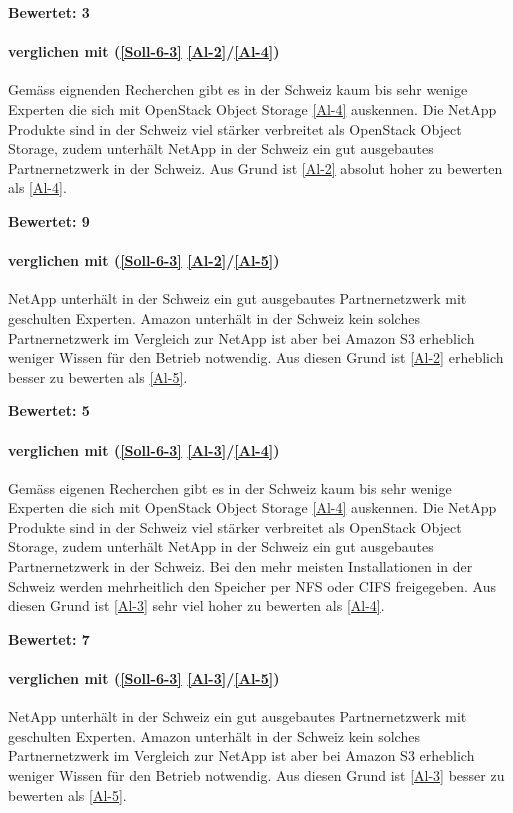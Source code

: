 \textbf{Bewertet: 3}

\paragraph*{  verglichen mit  (\ref{Soll-6-3} \ref{Al-2}/\ref{Al-4})}
Gemäss eignenden Recherchen gibt es in der Schweiz kaum bis sehr wenige Experten die sich mit OpenStack Object Storage \ref{Al-4} auskennen. Die NetApp Produkte sind in der Schweiz viel stärker verbreitet als OpenStack Object Storage, zudem unterhält NetApp in der Schweiz ein gut ausgebautes Partnernetzwerk in der Schweiz. Aus Grund ist  \ref{Al-2} absolut hoher zu bewerten als  \ref{Al-4}.

\textbf{Bewertet: 9}

\paragraph*{  verglichen mit  (\ref{Soll-6-3} \ref{Al-2}/\ref{Al-5})}
NetApp unterhält in der Schweiz ein gut ausgebautes Partnernetzwerk mit geschulten Experten. Amazon unterhält in der Schweiz kein solches Partnernetzwerk im Vergleich zur NetApp ist aber bei Amazon S3 erheblich weniger Wissen für den Betrieb notwendig. Aus diesen Grund ist  \ref{Al-2} erheblich besser zu bewerten als  \ref{Al-5}.

\textbf{Bewertet: 5}

\paragraph*{  verglichen mit  (\ref{Soll-6-3} \ref{Al-3}/\ref{Al-4})}
Gemäss eigenen Recherchen gibt es in der Schweiz kaum bis sehr wenige Experten die sich mit OpenStack Object Storage \ref{Al-4} auskennen. Die NetApp Produkte sind in der Schweiz viel stärker verbreitet als OpenStack Object Storage, zudem unterhält NetApp in der Schweiz ein gut ausgebautes Partnernetzwerk in der Schweiz. Bei den mehr meisten Installationen in der Schweiz werden mehrheitlich den Speicher per NFS oder CIFS freigegeben. Aus diesen Grund ist  \ref{Al-3} sehr viel hoher zu bewerten als  \ref{Al-4}.

\textbf{Bewertet: 7}


\paragraph*{  verglichen mit  (\ref{Soll-6-3} \ref{Al-3}/\ref{Al-5})}
NetApp unterhält in der Schweiz ein gut ausgebautes Partnernetzwerk mit geschulten Experten. Amazon unterhält in der Schweiz kein solches Partnernetzwerk im Vergleich zur NetApp ist aber bei Amazon S3 erheblich weniger Wissen für den Betrieb notwendig. Aus diesen Grund ist  \ref{Al-3} besser zu bewerten als  \ref{Al-5}.

